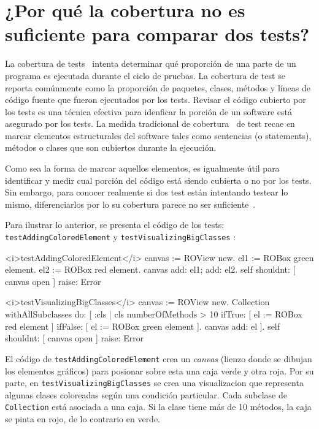 \chapter{¿Por qué la cobertura no es suficiente para comparar dos tests?}

\par La cobertura de tests~\cite{Horwi02a} intenta determinar qué proporción de una parte de un programa es ejecutada durante el ciclo de pruebas. La cobertura de test se reporta comúnmente como la proporción de paquetes, clases, métodos y líneas de código fuente que fueron ejecutados por los tests. Revisar el código cubierto por los tests es una técnica efectiva para idenficar la porción de un software está asegurado por los tests. La medida tradicional de cobertura~\cite{Mock09a,Piwo93a} de test recae en marcar elementos estructurales del software tales como sentencias (o statements), métodos o clases que son cubiertos durante la ejecución.

\par Como sea la forma de marcar aquellos elementos, es igualmente útil para identificar y medir cual porción del código está siendo cubierta o no por los tests. Sin embargo, para conocer realmente si dos test están intentando testear lo mismo, diferenciarlos por lo su cobertura parece no ser suficiente~\cite{van2001refactoring,greiler2012test}.    

\par Para ilustrar lo anterior, se presenta el código de los tests: {\tt testAddingColoredElement} y {\tt testVisualizingBigClasses} :

\begin{codeWithLineNumbers}
<i>testAddingColoredElement</i>
	canvas := ROView new.
	el1 := ROBox green element.
	el2 := ROBox red element.
	canvas add: el1; add: el2.
	self shouldnt: [ canvas open ] raise: Error

<i>testVisualizingBigClasses</i>
	canvas := ROView new.
	Collection withAllSubclasses do: [ :cls |
		cls numberOfMethods > 10
			ifTrue: [ el := ROBox red element ]
			ifFalse: [ el := ROBox green element ].
		canvas add: el ].
	self shouldnt: [ canvas open ] raise: Error
\end{codeWithLineNumbers} 

\par El código de {\tt testAddingColoredElement} crea un \emph{canvas} (lienzo donde se dibujan los elementos gráficos) para posionar sobre esta una caja verde y otra roja. Por su parte, en {\tt testVisualizingBigClasses} se crea una visualizacion que representa algunas clases coloreadas según una condición particular. Cada subclase de {\tt Collection} está asociada a una caja. Si la clase tiene más de 10 métodos, la caja se pinta en rojo, de lo contrario en verde. 


